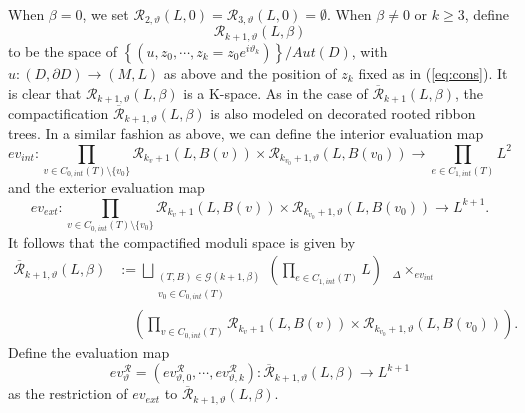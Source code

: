 \documentclass[a4paper]{article}
\numberwithin{equation}{section}
\begin{document}
When $\beta=0$, we set $\mathcal{R}_{2,\vartheta}(L,0)=\mathcal{R}_{3,\vartheta}(L,0)=\emptyset$. When $\beta\neq0$ or $k\geq3$, define
\begin{equation}
\mathcal{R}_{k+1,\vartheta}(L,\beta)
\end{equation}
to be the space of $\left\{(u,z_0,\cdots,z_k=z_0e^{i\vartheta_k})\right\}/\mathit{Aut}(D)$, with $u:(D,\partial D)\rightarrow(M,L)$ as above and the position of $z_k$ fixed as in (\ref{eq:cons}). It is clear that $\mathcal{R}_{k+1,\vartheta}(L,\beta)$ is a K-space.  As in the case of $\overline{\mathcal{R}}_{k+1}(L,\beta)$, the compactification $\overline{\mathcal{R}}_{k+1,\vartheta}(L,\beta)$ is also modeled on decorated rooted ribbon trees. In a similar fashion as above, we can define the interior evaluation map
\begin{equation}
\mathit{ev}_\mathit{int}:\prod_{v\in C_{0,\mathit{int}}(T)\setminus\{v_0\}}\mathcal{R}_{k_v+1}(L,B(v))\times\mathcal{R}_{k_{v_0}+1,\vartheta}(L,B(v_0))\rightarrow\prod_{e\in C_{1,\mathit{int}}(T)}L^2
\end{equation}
and the exterior evaluation map
\begin{equation}\label{eq:ext2}
\mathit{ev}_\mathit{ext}:\prod_{v\in C_{0,\mathit{int}}(T)\setminus\{v_0\}}\mathcal{R}_{k_v+1}(L,B(v))\times\mathcal{R}_{k_{v_0}+1,\vartheta}(L,B(v_0))\rightarrow L^{k+1}.
\end{equation}
It follows that the compactified moduli space is given by
\begin{equation}
\begin{split}
\overline{\mathcal{R}}_{k+1,\vartheta}(L,\beta)&:=\bigsqcup_{\substack{(T,B)\in\mathcal{G}(k+1,\beta)\\v_0\in C_{0,\mathit{int}}(T)}}\left(\prod_{e\in C_{1,\mathit{int}}(T)}L\right)\textrm{ }{{}_\Delta\times_{\mathit{ev}_\mathit{int}}}\textrm{ } \\
&\;\;\;\;\left(\prod_{v\in C_{0,\mathit{int}}(T)}\mathcal{R}_{k_v+1}(L,B(v))\times\mathcal{R}_{k_{v_0}+1,\vartheta}(L,B(v_0))\right).
\end{split}
\end{equation}
Define the evaluation map
\begin{equation}
\mathit{ev}_\vartheta^\mathcal{R}=(\mathit{ev}_{\vartheta,0}^\mathcal{R},\cdots,\mathit{ev}_{\vartheta,k}^\mathcal{R}):\overline{\mathcal{R}}_{k+1,\vartheta}(L,\beta)\rightarrow L^{k+1}
\end{equation}
as the restriction of $\mathit{ev}_\mathit{ext}$ to $\overline{\mathcal{R}}_{k+1,\vartheta}(L,\beta)$.
\end{document}
